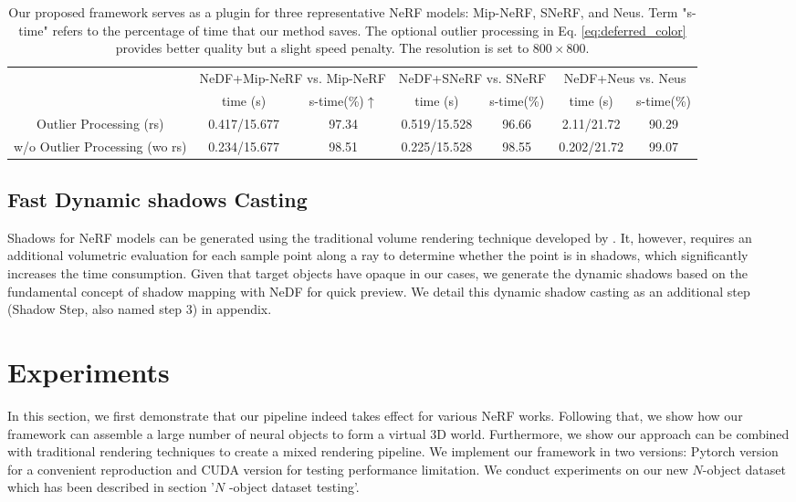 \documentclass[letterpaper]{article}
\begin{document}
\begin{table}[htbp]
\begin{center}
\begin{adjustbox}{width=0.04\columnwidth}
\begin{tabular}{c|cc|cc|cc}
\hline
 & \multicolumn{2}{c|}{NeDF+Mip-NeRF vs. Mip-NeRF } & \multicolumn{2}{c|}{NeDF+SNeRF vs. SNeRF} & \multicolumn{2}{c}{NeDF+Neus vs. Neus} \\ \cline{2-7}
 & time (s)   & s-time(\%)$\uparrow$   & time (s)   & s-time(\%)    &  time (s)  & s-time(\%)   \\ \hline
Outlier Processing (rs)    &0.417/15.677  & 97.34 & 0.519/15.528 & 96.66 & 2.11/21.72  & 90.29 \\
w/o Outlier Processing (wo rs) &0.234/15.677  & 98.51 & 0.225/15.528  & 98.55 & 0.202/21.72  & 99.07 \\ \hline
\end{tabular}
\end{adjustbox}
\caption{Our proposed framework serves as a plugin for three representative NeRF models: Mip-NeRF, SNeRF, and Neus. Term "s-time" refers to the percentage of time that our method saves. The optional outlier processing in Eq. \ref{eq:deferred_color} provides better quality but a slight speed penalty. The resolution is set to $800\times800$.}
\label{tab:3based}
\end{center}
\end{table}


\subsection{Fast Dynamic shadows Casting}
Shadows for NeRF models can be generated using the traditional volume rendering technique developed by \cite{max1995optical}. It, however, requires an additional volumetric evaluation for each sample point along a ray to determine whether the point is in shadows, which significantly increases the time consumption.
Given that target objects have opaque in our cases, we generate the dynamic shadows based on the fundamental concept of shadow mapping \cite{williams1978casting} with NeDF for quick preview. We detail this dynamic shadow casting as an additional step (Shadow Step, also named step 3) in appendix.

\section{Experiments}
In this section, we first demonstrate that our pipeline indeed takes effect for various NeRF works. Following that, we show how our framework can assemble a large number of neural objects to form a virtual 3D world. Furthermore, we show our approach can be combined with traditional rendering techniques to create a mixed rendering pipeline. We implement our framework in two versions: Pytorch version for a convenient reproduction and CUDA version for testing performance limitation. We conduct experiments on our new $N$-object dataset which has been described in section '$N$ -object dataset testing'.
\end{document}
